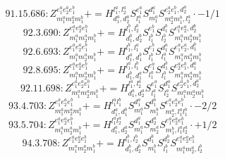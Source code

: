 \documentclass[letterpaper,10pt,fleqn,leqno,onecolumn]{article}
\begin{document}
\begin{equation} \;\;\;\;\;\;  91.15.686: Z^{e_{1}^{a}e_{2}^{a}e_{1}^{b}}_{m_{1}^{a}m_{2}^{a}m_{1}^{b}}+=H^{l_{1}^{a},l_{2}^{a}}_{d_{1}^{a},d_{2}^{a}}S^{e_{1}^{a}}_{l_{1}^{a}}S^{d_{1}^{a}}_{m_{1}^{a}}S^{e_{2}^{a}e_{1}^{b},d_{2}^{a}}_{m_{2}^{a}m_{1}^{b},l_{2}^{a}}\cdot -1/1 \end{equation}
\begin{equation} \;\;\;\;\;\;  92.3.690: Z^{e_{1}^{a}e_{2}^{a}e_{1}^{b}}_{m_{1}^{a}m_{2}^{a}m_{1}^{b}}+=H^{l_{1}^{b},l_{2}^{b}}_{d_{1}^{b},d_{2}^{b}}S^{e_{1}^{b}}_{l_{1}^{b}}S^{d_{1}^{b}}_{l_{2}^{b}}S^{e_{1}^{a}e_{2}^{a},d_{2}^{b}}_{m_{1}^{a}m_{2}^{a}m_{1}^{b}} \end{equation}
\begin{equation} \;\;\;\;\;\;  92.6.693: Z^{e_{1}^{a}e_{2}^{a}e_{1}^{b}}_{m_{1}^{a}m_{2}^{a}m_{1}^{b}}+=H^{l_{1}^{b},l_{1}^{a}}_{d_{1}^{a},d_{1}^{b}}S^{e_{1}^{b}}_{l_{1}^{b}}S^{d_{1}^{a}}_{l_{1}^{a}}S^{e_{1}^{a}e_{2}^{a},d_{1}^{b}}_{m_{1}^{a}m_{2}^{a}m_{1}^{b}} \end{equation}
\begin{equation} \;\;\;\;\;\;  92.8.695: Z^{e_{1}^{a}e_{2}^{a}e_{1}^{b}}_{m_{1}^{a}m_{2}^{a}m_{1}^{b}}+=H^{l_{1}^{a},l_{1}^{b}}_{d_{1}^{b},d_{1}^{a}}S^{e_{1}^{a}}_{l_{1}^{a}}S^{d_{1}^{b}}_{l_{1}^{b}}S^{e_{2}^{a}e_{1}^{b},d_{1}^{a}}_{m_{1}^{a}m_{2}^{a}m_{1}^{b}} \end{equation}
\begin{equation} \;\;\;\;\;\;  92.11.698: Z^{e_{1}^{a}e_{2}^{a}e_{1}^{b}}_{m_{1}^{a}m_{2}^{a}m_{1}^{b}}+=H^{l_{1}^{a},l_{2}^{a}}_{d_{1}^{a},d_{2}^{a}}S^{e_{1}^{a}}_{l_{1}^{a}}S^{d_{1}^{a}}_{l_{2}^{a}}S^{e_{2}^{a}e_{1}^{b},d_{2}^{a}}_{m_{1}^{a}m_{2}^{a}m_{1}^{b}} \end{equation}
\begin{equation} \;\;\;\;\;\;  93.4.703: Z^{e_{1}^{a}e_{2}^{a}e_{1}^{b}}_{m_{1}^{a}m_{2}^{a}m_{1}^{b}}+=H^{l_{1}^{a}l_{1}^{b}}_{d_{1}^{a},d_{1}^{b}}S^{d_{1}^{a}}_{m_{1}^{a}}S^{d_{1}^{b}}_{m_{1}^{b}}S^{e_{1}^{a}e_{2}^{a}e_{1}^{b}}_{m_{2}^{a},l_{1}^{a}l_{1}^{b}}\cdot -2/2 \end{equation}
\begin{equation} \;\;\;\;\;\;  93.5.704: Z^{e_{1}^{a}e_{2}^{a}e_{1}^{b}}_{m_{1}^{a}m_{2}^{a}m_{1}^{b}}+=H^{l_{1}^{a}l_{2}^{a}}_{d_{1}^{a},d_{2}^{a}}S^{d_{1}^{a}}_{m_{1}^{a}}S^{d_{2}^{a}}_{m_{2}^{a}}S^{e_{1}^{a}e_{2}^{a}e_{1}^{b}}_{m_{1}^{b},l_{1}^{a}l_{2}^{a}}\cdot +1/2 \end{equation}
\begin{equation} \;\;\;\;\;\;  94.3.708: Z^{e_{1}^{a}e_{2}^{a}e_{1}^{b}}_{m_{1}^{a}m_{2}^{a}m_{1}^{b}}+=H^{l_{1}^{b},l_{2}^{b}}_{d_{1}^{b},d_{2}^{b}}S^{d_{1}^{b}}_{m_{1}^{b}}S^{d_{2}^{b}}_{l_{1}^{b}}S^{e_{1}^{a}e_{2}^{a}e_{1}^{b}}_{m_{1}^{a}m_{2}^{a},l_{2}^{b}} \end{equation}
\end{document}
